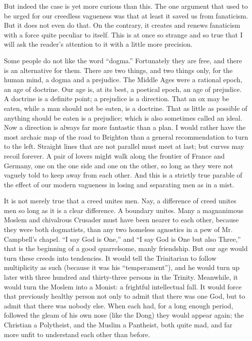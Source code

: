 \documentclass{book}
\begin{document}
But indeed the case is yet more curious than this. The one argument that used to be urged for our creedless vagueness was that at least it saved us from fanaticism. But it does not even do that. On the contrary, it creates and renews fanaticism with a force quite peculiar to itself. This is at once so strange and so true that I will ask the reader’s attention to it with a little more precision.

Some people do not like the word “dogma.” Fortunately they are free, and there is an alternative for them. There are two things, and two things only, for the human mind, a dogma and a prejudice. The Middle Ages were a rational epoch, an age of doctrine. Our age is, at its best, a poetical epoch, an age of prejudice. A doctrine is a definite point; a prejudice is a direction. That an ox may be eaten, while a man should not be eaten, is a doctrine. That as little as possible of anything should be eaten is a prejudice; which is also sometimes called an ideal. Now a direction is always far more fantastic than a plan. I would rather have the most archaic map of the road to Brighton than a general recommendation to turn to the left. Straight lines that are not parallel must meet at last; but curves may recoil forever. A pair of lovers might walk along the frontier of France and Germany, one on the one side and one on the other, so long as they were not vaguely told to keep away from each other. And this is a strictly true parable of the effect of our modern vagueness in losing and separating men as in a mist.

It is not merely true that a creed unites men. Nay, a difference of creed unites men so long as it is a clear difference. A boundary unites. Many a magnanimous Moslem and chivalrous Crusader must have been nearer to each other, because they were both dogmatists, than any two homeless agnostics in a pew of Mr. Campbell’s chapel. “I say God is One,” and “I say God is One but also Three,” that is the beginning of a good quarrelsome, manly friendship. But our age would turn these creeds into tendencies. It would tell the Trinitarian to follow multiplicity as such (because it was his “temperament”), and he would turn up later with three hundred and thirty-three persons in the Trinity. Meanwhile, it would turn the Moslem into a Monist: a frightful intellectual fall. It would force that previously healthy person not only to admit that there was one God, but to admit that there was nobody else. When each had, for a long enough period, followed the gleam of his own nose (like the Dong) they would appear again; the Christian a Polytheist, and the Muslim a Pantheist, both quite mad, and far more unfit to understand each other than before.
\end{document}
